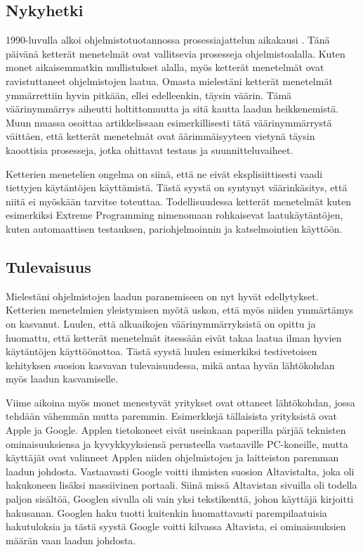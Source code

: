 \documentclass[a4paper]{article}
\begin{document}
\subsection{Nykyhetki}

1990-luvulla alkoi ohjelmistotuotannossa prosessiajattelun aikakausi \citep{whittaker2002}. Tänä päivänä ketterät menetelmät ovat vallitsevia prosesseja ohjelmistoalalla. Kuten monet aikaisemmatkin mullistukset alalla, myös ketterät menetelmät ovat ravistuttaneet ohjelmistojen laatua. Omasta mielestäni ketterät menetelmät ymmärrettiin hyvin pitkään, ellei edelleenkin, täysin väärin. Tämä väärinymmärrys aiheutti holtittomuutta ja sitä kautta laadun heikkenemistä. Muun muassa \citet{whittaker2002} osoittaa artikkelissaan esimerkillisesti tätä väärinymmärrystä väittäen, että ketterät menetelmät ovat äärimmäisyyteen vietynä täysin kaoottisia prosesseja, jotka ohittavat testaus ja suunnitteluvaiheet.

Ketterien menetelien ongelma on siinä, että ne eivät eksplisiittisesti vaadi tiettyjen käytäntöjen käyttämistä. Tästä syystä on syntynyt väärinkäsitys, että niitä ei myöskään tarvitse toteuttaa. Todellisuudessa ketterät menetelmät kuten esimerkiksi Extreme Programming nimenomaan rohkaisevat laatukäytäntöjen, kuten automaattisen testauksen, pariohjelmoinnin ja katselmointien käyttöön.

\subsection{Tulevaisuus}

Mielestäni ohjelmistojen laadun paranemiseen on nyt hyvät edellytykset. Ketterien menetelmien yleistymisen myötä uskon, että myös niiden ymmärtämys on kasvanut. Luulen, että alkuaikojen väärinymmärryksistä on opittu ja huomattu, että ketterät menetelmät itsessään eivät takaa laatua ilman hyvien käytäntöjen käyttöönottoa. Tästä syystä luulen esimerkiksi testivetoisen kehityksen suosion kasvavan tulevaisuudessa, mikä antaa hyvän lähtökohdan myös laadun kasvamiselle.

Viime aikoina myös monet menestyvät yritykset ovat ottaneet lähtökohdan, jossa tehdään vähemmän mutta paremmin. Esimerkkejä tällaisista yrityksistä ovat Apple ja Google. Applen tietokoneet eivät useinkaan paperilla pärjää teknisten ominaisuuksiensa ja kyvykkyyksiensä perusteella vastaaville PC-koneille, mutta käyttäjät ovat valinneet Applen niiden ohjelmistojen ja laitteiston paremman laadun johdosta. Vastaavasti Google voitti ihmisten suosion Altavistalta, joka oli hakukoneen lisäksi massiivinen portaali. Siinä missä Altavistan sivuilla oli todella paljon sisältöä, Googlen sivulla oli vain yksi tekstikenttä, johon käyttäjä kirjoitti hakusanan. Googlen haku tuotti kuitenkin huomattavasti parempilaatuisia hakutuloksia ja tästä syystä Google voitti kilvassa Altavista, ei ominaisuuksien määrän vaan laadun johdosta.
\end{document}

